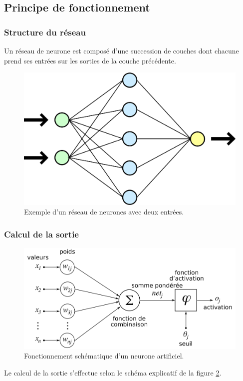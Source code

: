 	\subsection{Principe de fonctionnement}

		\subsubsection{Structure du r\'eseau}

Un r\'eseau de neurone est compos\'e d'une succession de couches dont chacune prend ses entr\'ees sur les sorties de la couche pr\'ec\'edente.

\begin{figure}[H]
	\centering
	\includegraphics[width=0.66\linewidth]{img/Neural_network.png} 
	\caption{Exemple d'un r\'eseau de neurones avec deux entr\'ees.}
	\label{neurone_ex}
\end{figure}

		\subsubsection{Calcul de la sortie}

\begin{figure}[H]
	\centering
	\includegraphics[width=0.66\linewidth]{img/NeuronModel.png} 
	\caption{Fonctionnement sch\'ematique d'un neurone artificiel.}
	\label{neurone_schema}
\end{figure}

Le calcul de la sortie s'effectue selon le sch\'ema explicatif de la figure \ref{neurone_schema}.

